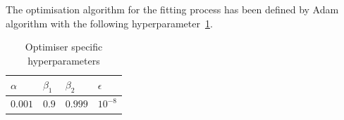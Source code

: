%
%
The optimisation algorithm for the fitting process has been defined by Adam algorithm with the following hyperparameter~\ref{tab:newM-params}. \\
\begin{table}[htbp]
    \centering
    \caption{Optimiser specific hyperparameters}
    \label{tab:newM-params}
    \begin{tabular}{ p{1.5cm} p{1.5cm} p{1.5cm} p{1.5cm}  }
        \hline
        $\alpha$ & $\beta_1 $ & $\beta_2$ & $\epsilon$ \\
        \hline
        $0.001$ & $0.9$ & $0.999$ & $10^{-8}$ \\%
        \hline
    \end{tabular}
\end{table}